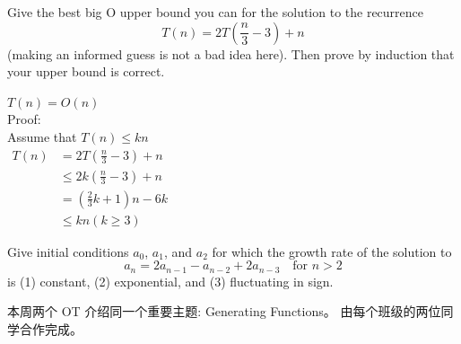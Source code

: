\documentclass[a4paper, justified]{tufte-handout}
\begin{document}
\begin{problem}[CS 4.5-10]
Give the best big O upper bound you can for the solution to the recurrence
$$T(n) = 2T(\frac{n}{3} - 3) + n$$
(making an informed guess is not a bad idea here). Then prove by induction that your upper bound is correct.
\end{problem}

\begin{solution}
  $T(n) = O(n)$\\
  Proof:\\
  Assume that $T(n) \leq kn$\\
  $\begin{aligned}
      T(n) & = 2T(\frac{n}{3} - 3) + n    \\
           & \leq 2k(\frac{n}{3} - 3) + n \\
           & =(\frac{2}{3}k+1)n-6k        \\
           & \leq kn(k \geq 3)
    \end{aligned}$
\end{solution}

\beginoptional

\begin{problem}
Give initial conditions $a_0$, $a_1$, and $a_2$ for which the growth rate of the solution to
\[
  a_{n} = 2a_{n-1} - a_{n-2} + 2a_{n-3} \quad \text{for } n > 2
\]
is (1) constant, (2) exponential, and (3) fluctuating in sign.
\end{problem}

\begin{solution}

\end{solution}

\beginot

% 

本周两个 OT 介绍同一个重要主题: Generating Functions。
由每个班级的两位同学合作完成。
\end{document}
